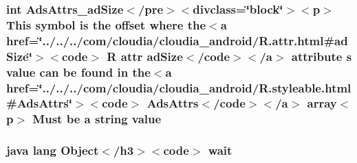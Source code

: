 \hypertarget{_r_8styleable_8html_a79faef6830028a7512fcc5ecfe223f6e}{
\subsubsection[{value}]{\setlength{\rightskip}{0pt plus 5cm}int Ads\-Attrs\-\_\-ad\-Size$<$/pre$>$$<$divclass=\char`\"{}block\char`\"{}$>$$<$p$>$ This symbol is the offset where the$<${\bf a} href=\char`\"{}../../../com/cloudia/cloudia\-\_\-android/R.\-attr.\-html\#ad\-Size\char`\"{}$>$$<$code$>$ {\bf R} attr ad\-Size$<$/code$>$$<$/{\bf a}$>$ attribute s value can be found in the$<${\bf a} href=\char`\"{}../../../com/cloudia/cloudia\-\_\-android/R.\-styleable.\-html\#Ads\-Attrs\char`\"{}$>$$<$code$>$ Ads\-Attrs$<$/code$>$$<$/{\bf a}$>$ array$<$p$>$ Must be {\bf a} {\bf string} value}}\label{_r_8styleable_8html_a79faef6830028a7512fcc5ecfe223f6e}
\hypertarget{_r_8styleable_8html_a9a9f0c22e5688d478c707f910f1c1aea}{
\subsubsection[{wait}]{\setlength{\rightskip}{0pt plus 5cm}java lang Object$<$/h3$>$$<$code$>$ wait}}\label{_r_8styleable_8html_a9a9f0c22e5688d478c707f910f1c1aea}
